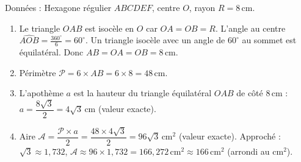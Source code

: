 \documentclass[11pt]{article}
\begin{document}
\begin{corrige}
Données : Hexagone régulier $ABCDEF$, centre $O$, rayon $R=8\,\text{cm}$.
\begin{enumerate}
\item Le triangle $OAB$ est isocèle en $O$ car $OA=OB=R$. L'angle au centre $\widehat{AOB}=\frac{360^{\circ}}{6}=60^{\circ}$. Un triangle isocèle avec un angle de $60^{\circ}$ au sommet est équilatéral. Donc $AB=OA=OB=8\,\text{cm}$.
\item Périmètre $\mathcal{P} = 6 \times AB = 6 \times 8 = 48\,\text{cm}$.
\item L'apothème $a$ est la hauteur du triangle équilatéral $OAB$ de côté $8\,\text{cm}$ :
$a = \dfrac{8\sqrt{3}}{2} = 4\sqrt{3}\,\text{cm}$ (valeur exacte).
\item Aire $\mathcal{A} = \dfrac{\mathcal{P}\times a}{2} = \dfrac{48 \times 4\sqrt{3}}{2} = 96\sqrt{3}\,\text{cm}^2$ (valeur exacte).
Approché : $\sqrt{3}\approx 1,732$, $\mathcal{A}\approx 96\times 1,732 = 166,272\,\text{cm}^2 \approx \boxed{166\,\text{cm}^2}$ (arrondi au $\text{cm}^2$).
\end{enumerate}
\end{corrige}
\end{document}
